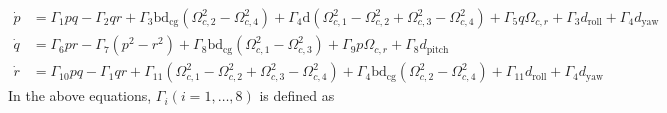 \documentclass[3p]{elsarticle}
\begin{document}
\begin{align}
    \dot{p} &= \Gamma_1 pq - \Gamma_2 qr + \Gamma_3 \mathrm{b}\mathrm{d}_{\text{cg}} (\Omega_{c, 2}^2 - \Omega_{c, 4}^2) + \Gamma_4 \mathrm{d} (\Omega_{c, 1}^2 - \Omega_{c, 2}^2 + \Omega_{c, 3}^2 - \Omega_{c, 4}^2) + \Gamma_5 q \Omega_{c, r} + \Gamma_3 d_{\text{roll}} + \Gamma_4 d_{\text{yaw}} \\
    \dot{q} &= \Gamma_6 pr - \Gamma_7 (p^2 - r^2) + \Gamma_8  \mathrm{b}\mathrm{d}_{\text{cg}}(\Omega_{c, 1}^2 - \Omega_{c, 3}^2) + \Gamma_9 p \Omega_{c, r} + \Gamma_8 d_{\text{pitch}} \\
    \dot{r} &= \Gamma_{10} pq - \Gamma_{1} qr + \Gamma_{11} (\Omega_{c, 1}^2 - \Omega_{c, 2}^2 + \Omega_{c, 3}^2 - \Omega_{c, 4}^2) + \Gamma_{4}  \mathrm{b}\mathrm{d}_{\text{cg}} (\Omega_{c, 2}^2 - \Omega_{c, 4}^2) + \Gamma_{11} d_{\text{roll}} + \Gamma_{4} d_{\text{yaw}}
\end{align}
In the above equations, $\Gamma_i (i = 1, \ldots, 8)$ is defined as
\end{document}
